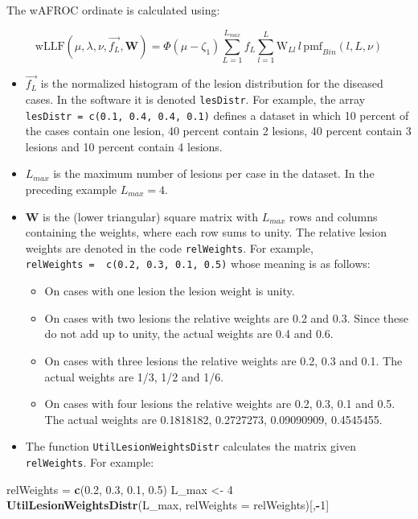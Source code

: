 \documentclass[
]{book}
\newenvironment{Shaded}{\begin{snugshade}}{\end{snugshade}}
\newcommand{\DataTypeTok}[1]{\textcolor[rgb]{0.13,0.29,0.53}{#1}}
\newcommand{\DecValTok}[1]{\textcolor[rgb]{0.00,0.00,0.81}{#1}}
\newcommand{\FloatTok}[1]{\textcolor[rgb]{0.00,0.00,0.81}{#1}}
\newcommand{\KeywordTok}[1]{\textcolor[rgb]{0.13,0.29,0.53}{\textbf{#1}}}
\newcommand{\NormalTok}[1]{#1}
\newcommand{\OperatorTok}[1]{\textcolor[rgb]{0.81,0.36,0.00}{\textbf{#1}}}
\newcommand{\StringTok}[1]{\textcolor[rgb]{0.31,0.60,0.02}{#1}}
\providecommand{\tightlist}{%
  \setlength{\itemsep}{0pt}\setlength{\parskip}{0pt}}
\begin{document}
The wAFROC ordinate is calculated using:

\begin{equation} 
\text{wLLF} \left ( \mu, \lambda, \nu, \overrightarrow{f_L}, \mathbf{W} \right ) = \Phi\left ( \mu - \zeta_1 \right )\sum_{L=1}^{L_{max}} f_L \sum_{l=1}^{L} \text{W}_{Ll} \, l \, \text{pmf}_{Bin}\left ( l, L, \nu \right )
\label{eq:rsm-pred-wllf}
\end{equation}

\begin{itemize}
\item
  \(\overrightarrow{f_L}\) is the normalized histogram of the lesion distribution for the diseased cases. In the software it is denoted \texttt{lesDistr}. For example, the array \texttt{lesDistr\ =\ c(0.1,\ 0.4,\ 0.4,\ 0.1)} defines a dataset in which 10 percent of the cases contain one lesion, 40 percent contain 2 lesions, 40 percent contain 3 lesions and 10 percent contain 4 lesions.
\item
  \(L_{max}\) is the maximum number of lesions per case in the dataset. In the preceding example \(L_{max} = 4\).
\item
  \(\mathbf{W}\) is the (lower triangular) square matrix with \(L_{max}\) rows and columns containing the weights, where each row sums to unity. The relative lesion weights are denoted in the code \texttt{relWeights}. For example, \texttt{relWeights\ =\ \ c(0.2,\ 0.3,\ 0.1,\ 0.5)} whose meaning is as follows:

  \begin{itemize}
  \tightlist
  \item
    On cases with one lesion the lesion weight is unity.
  \item
    On cases with two lesions the relative weights are 0.2 and 0.3. Since these do not add up to unity, the actual weights are 0.4 and 0.6.
  \item
    On cases with three lesions the relative weights are 0.2, 0.3 and 0.1. The actual weights are 1/3, 1/2 and 1/6.
  \item
    On cases with four lesions the relative weights are 0.2, 0.3, 0.1 and 0.5. The actual weights are 0.1818182, 0.2727273, 0.09090909, 0.4545455.
  \end{itemize}
\item
  The function \texttt{UtilLesionWeightsDistr} calculates the matrix given \texttt{relWeights}. For example:
\end{itemize}

\begin{Shaded}
\begin{Highlighting}[]
\NormalTok{relWeights =}\StringTok{  }\KeywordTok{c}\NormalTok{(}\FloatTok{0.2}\NormalTok{, }\FloatTok{0.3}\NormalTok{, }\FloatTok{0.1}\NormalTok{, }\FloatTok{0.5}\NormalTok{)}
\NormalTok{L_max <-}\StringTok{ }\DecValTok{4}
\KeywordTok{UtilLesionWeightsDistr}\NormalTok{(L_max, }\DataTypeTok{relWeights =}\NormalTok{ relWeights)[,}\OperatorTok{-}\DecValTok{1}\NormalTok{]}
\end{Highlighting}
\end{Shaded}
\end{document}
